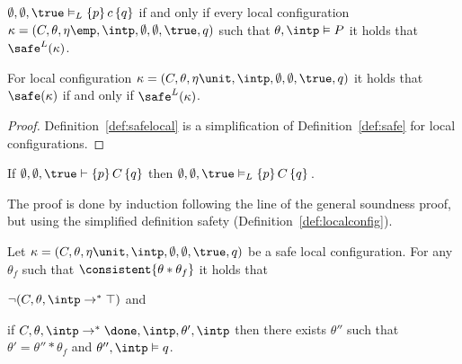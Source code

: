 \begin{defin}\label{def:semtriple}
$\emptyset,\emptyset,\true \vDash_L \{ p \} \, c \, \{ q \}$ if and only if 
every local configuration $\kappa = (C,\theta,\eta\emp,\intp,\emptyset,\emptyset,\true, q)$
such that 
$\theta,\intp \vDash P$ it holds that $\safe^L(\kappa)$.
\end{defin}

\begin{lemma}
For local configuration $\kappa = (C,\theta,\eta\unit,\intp,\emptyset,\emptyset,\true, q)$ 
it holds that
$\safe(\kappa)$ if and only if $\safe^L(\kappa)$.
\end{lemma}

\begin{proof}
Definition~\ref{def:safelocal} is a simplification of Definition~\ref{def:safe}
for local configurations.
\end{proof}

\begin{theorem}
  If  $\emptyset,\emptyset,\true \vdash \{ p \} \, C \, \{ q \}$  
  then
  $\emptyset,\emptyset,\true \vDash_L \{ p \} \, C \, \{ q \}$\,.
\end{theorem}

\begin{sketch}
The proof is done by induction following the line of the general soundness proof, but using the simplified definition safety (Definition~\ref{def:localconfig}). 
\end{sketch}

\begin{lemma}\label{lem:safeloc:run}
  Let  $\kappa = (C,\theta,\eta\unit,\intp,\emptyset,\emptyset,\true, q)$ 
  be a safe local configuration.
  For any $\theta_f$ such that $\consistent{\theta*\theta_f}$ it holds that
  \begin{compactenum}
    \item \label{lem:safeloc:noabort} 
    $\neg(C,\theta,\intp \rightarrow^* \top)$ and
    \item \label{lem:safeloc:post} if 
      $C,\theta,\intp \rightarrow^* \done,\intp,\theta',\intp$
    then there exists $\theta''$ such that $\theta' = \theta'' * \theta_f$
    and $\theta'',\intp \vDash q$.
%    
  \end{compactenum}
\end{lemma}

 


